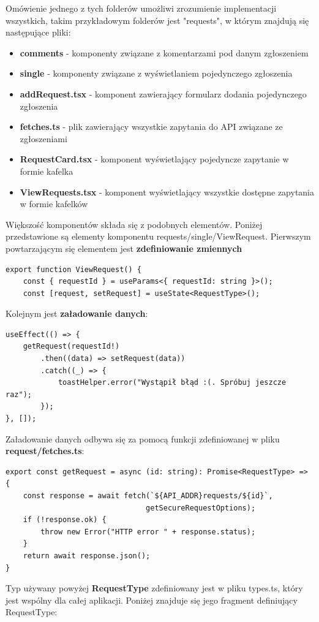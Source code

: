 Omówienie jednego z tych folderów umożliwi zrozumienie implementacji wszystkich, takim przykładowym folderów jest "requests", w którym znajdują się następujące pliki:
\begin{itemize}
    \item \textbf{comments} - komponenty związane z komentarzami pod danym zgłoszeniem
    \item \textbf{single} - komponenty związane z wyświetlaniem pojedynczego zgłoszenia
    \item \textbf{addRequest.tsx} - komponent zawierający formularz dodania pojedynczego zgłoszenia
    \item \textbf{fetches.ts} - plik zawierający wszystkie zapytania do API związane ze zgłoszeniami
    \item \textbf{RequestCard.tsx} - komponent wyświetlający pojedyncze zapytanie w formie kafelka
    \item \textbf{ViewRequests.tsx} - komponent wyświetlający wszystkie dostępne zapytania w formie kafelków
\end{itemize}
Większość komponentów składa się z podobnych elementów. Poniżej przedstawione są elementy komponentu requests/single/ViewRequest.
Pierwszym powtarzającym się elementem jest \textbf{zdefiniowanie zmiennych}
\begin{verbatim}
export function ViewRequest() {
    const { requestId } = useParams<{ requestId: string }>();
    const [request, setRequest] = useState<RequestType>();
\end{verbatim}
Kolejnym jest \textbf{załadowanie danych}:
\begin{verbatim}
useEffect(() => {
    getRequest(requestId!)
        .then((data) => setRequest(data))
        .catch((_) => {
            toastHelper.error("Wystąpił błąd :(. Spróbuj jeszcze raz");
        });
}, []);
\end{verbatim}
Załadowanie danych odbywa się za pomocą funkcji zdefiniowanej w pliku \textbf{request/fetches.ts}:
\begin{verbatim}
export const getRequest = async (id: string): Promise<RequestType> => {
    const response = await fetch(`${API_ADDR}requests/${id}`, 
                                getSecureRequestOptions);
    if (!response.ok) {
        throw new Error("HTTP error " + response.status);
    }
    return await response.json();
}
\end{verbatim}
Typ używany powyżej \textbf{RequestType} zdefiniowany jest w pliku types.ts, który jest wspólny dla całej aplikacji. Poniżej znajduje się jego fragment definiujący RequestType:
